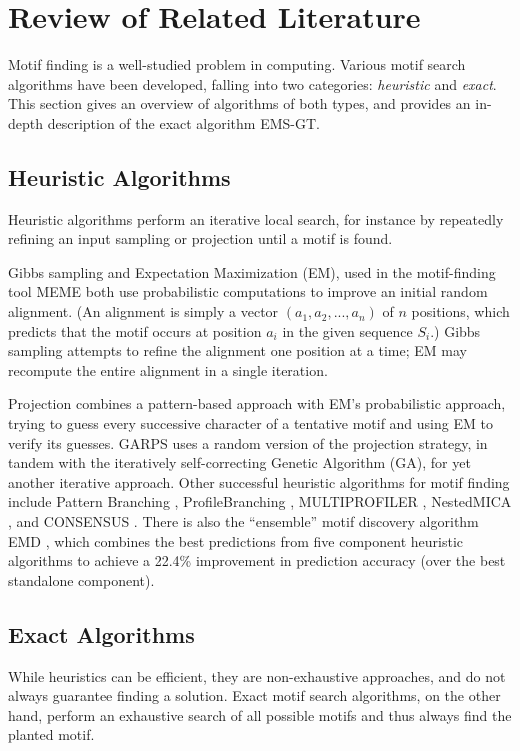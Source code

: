 \documentclass[oneside,12pt]{DISCSthesis}
\begin{document}
\chapter{Review of Related Literature}
	Motif finding is a well-studied problem in computing. Various motif search algorithms have been developed,
	falling into two categories: \emph{heuristic} and \emph{exact}. This section gives an overview of algorithms
	of both types, and provides an in-depth description of the exact algorithm EMS-GT.
	
	\section{Heuristic Algorithms}
		Heuristic algorithms perform an iterative local search, for instance by repeatedly refining an input sampling or projection until 
		a motif is found. 

		Gibbs sampling \cite{lawrence1993detecting} and Expectation Maximization (EM), used in the motif-finding tool MEME \cite{lawrence1990expectation,bailey1995unsupervised} both use probabilistic computations to improve an initial random alignment. (An alignment is simply a vector $(a_{1}, a_{2},...,a_{n})$ of $n$ positions, which predicts that the motif occurs at position $a_{i}$ in the given sequence $S_{i}$.) Gibbs sampling attempts to refine the alignment one position at a time; %
		EM may recompute the entire alignment in a single iteration. 

		Projection \cite{blanchette2002discovery} combines a pattern-based approach with EM's probabilistic approach, trying to guess every successive character of a tentative motif and using EM to verify its guesses. GARPS \cite{huo2009combining} uses a random version of the projection strategy, in tandem with the iteratively self-correcting Genetic Algorithm (GA), for yet another iterative approach. Other successful heuristic algorithms for motif finding include Pattern Branching \cite{price2003finding}, ProfileBranching \cite{price2003finding}, MULTIPROFILER \cite{keich2002finding}, NestedMICA \cite{down2005nestedmica}, and CONSENSUS \cite{hertz1999identifying}. There is also the ``ensemble'' motif discovery algorithm EMD \cite{hu2006emd}, which combines the best predictions from five component heuristic algorithms to achieve a 22.4\% improvement in prediction accuracy (over the best standalone component).

	\section{Exact Algorithms}
		While heuristics can be efficient, they are non-exhaustive approaches, and do not always guarantee finding a solution. Exact motif search algorithms, on the other hand, perform an exhaustive search of all possible motifs and thus always find the planted motif.
\end{document}
